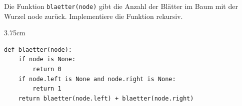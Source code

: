 \question[4]
Die Funktion \texttt{blaetter(node)} gibt die Anzahl der Blätter im Baum mit der Wurzel node zurück. Implementiere
die Funktion rekursiv.
\begin{solutionbox}{3.75cm}
\begin{lstlisting}
def blaetter(node):
    if node is None:
        return 0
    if node.left is None and node.right is None:
        return 1
    return blaetter(node.left) + blaetter(node.right)
\end{lstlisting}
\end{solutionbox}
